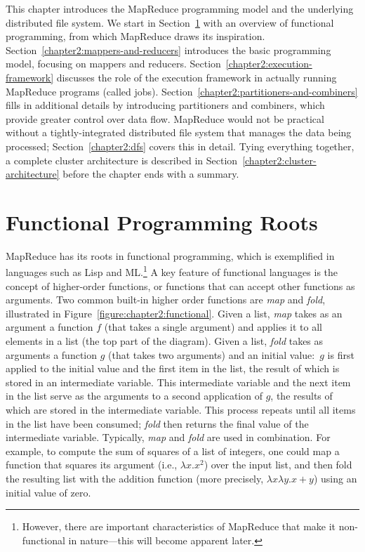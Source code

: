 This chapter introduces the MapReduce programming model and the
underlying distributed file system.  We start in
Section~\ref{chapter2:functional} with an overview of functional
programming, from which MapReduce draws its inspiration.
Section~\ref{chapter2:mappers-and-reducers} introduces the basic
programming model, focusing on mappers and reducers.
Section~\ref{chapter2:execution-framework} discusses the role of the
execution framework in actually running MapReduce programs (called
jobs).  Section~\ref{chapter2:partitioners-and-combiners} fills in
additional details by introducing partitioners and combiners, which
provide greater control over data flow.  MapReduce would not be
practical without a tightly-integrated distributed file system that
manages the data being processed; Section~\ref{chapter2:dfs} covers
this in detail.  Tying everything together, a complete cluster
architecture is described in
Section~\ref{chapter2:cluster-architecture} before the chapter ends
with a summary.

\section{Functional Programming Roots}
\label{chapter2:functional}

MapReduce has its roots in functional programming, which is
exemplified in languages such as Lisp and ML.\footnote{However, there
are important characteristics of MapReduce that make it non-functional
in nature---this will become apparent later.} A key feature of
functional languages is the concept of higher-order functions, or
functions that can accept other functions as arguments.  Two common
built-in higher order functions are \emph{map} and \emph{fold},
illustrated in Figure~\ref{figure:chapter2:functional}.  Given a list,
\emph{map} takes as an argument a function $f$ (that takes a single
argument) and applies it to all elements in a list (the top part of
the diagram).  Given a list, \emph{fold} takes as arguments a function
$g$ (that takes two arguments) and an initial value:\ $g$ is first
applied to the initial value and the first item in the list, the
result of which is stored in an intermediate variable.  This
intermediate variable and the next item in the list serve as the
arguments to a second application of $g$, the results of which are
stored in the intermediate variable.  This process repeats until all
items in the list have been consumed; \emph{fold} then returns the
final value of the intermediate variable.  Typically, \emph{map} and
\emph{fold} are used in combination.  For example, to compute the sum
of squares of a list of integers, one could map a function that
squares its argument (i.e., $\lambda x. x^2$) over the input list, and
then fold the resulting list with the addition function (more
precisely, $\lambda x \lambda y. x + y$) using an initial value of
zero.

